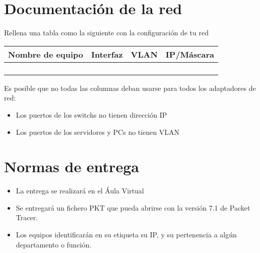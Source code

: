\section{Documentación de la red}
Rellena una tabla como la siguiente con la configuración de tu red

\begin{center}
  \begin{tabular}{|c|c|c|c|}
    \hline
    Nombre de equipo & Interfaz & VLAN & IP/Máscara \\
    \hline
                     & & & \\
                     & & & \\
                     & & & \\
                     & & & \\
    \hline
  \end{tabular}
\end{center}

Es posible que no todas las columnas deban usarse para todos los adaptadores de red:
\begin{itemize}
\item Los puertos de los switchs no tienen dirección IP
\item Los puertos de los servidores y PCs no tienen VLAN
\end{itemize}

\section{Normas de entrega}
\begin{itemize}
  
\item La entrega se realizará en el Áula Virtual
\item Se entregará un fichero PKT que pueda abrirse con la versión 7.1 de Packet Tracer.
\item Los equipos identificarán en su etiqueta su IP, y su pertenencia a algún departamento o función.
\end{itemize}

